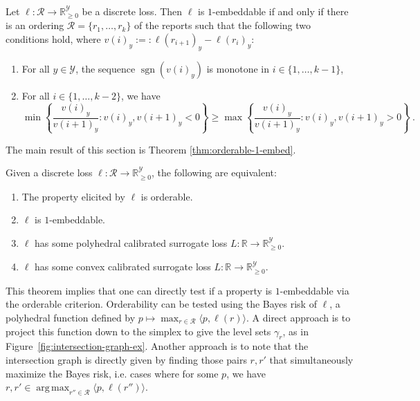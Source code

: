 \documentclass[anon]{colt2020} %
\newcommand{\reals}{\mathbb{R}}
\newcommand{\nonnegreals}{\reals_{\geq 0}}%
\newcommand{\R}{\mathcal{R}}
\newcommand{\Y}{\mathcal{Y}}
\newcommand{\inprod}[2]{\langle #1, #2 \rangle}%
\DeclareMathOperator*{\argmax}{arg\,max}
\DeclareMathOperator*{\sgn}{sgn}
\begin{document}
\begin{theorem}
  Let $\ell: \R \to \nonnegreals^{\Y}$ be a discrete loss.
  Then $\ell$ is $1$-embeddable if and only if there is an ordering $\R = \{r_1,\ldots,r_k\}$ of the reports such that the following two conditions hold, where $v(i)_y := : \ell(r_{i+1})_y - \ell(r_i)_y$:
  \begin{enumerate}
  \item For all $y\in\Y$, the sequence $\sgn(v(i)_y)$ is monotone in
    $i\in\{1,\ldots,k-1\}$,
  \item For all $i\in\{1,\ldots,k-2\}$, we have
    \begin{equation}
      \label{eq:1}
      \min \left\{\frac{v(i)_y}{v({i+1})_y} : v(i)_y, v({i+1})_y < 0\right\}
      \geq
      \max \left\{\frac{v(i)_y}{v({i+1})_y} : v(i)_y, v({i+1})_y > 0\right\}~.
    \end{equation}
  \end{enumerate}
\end{theorem}


The main result of this section is Theorem \ref{thm:orderable-1-embed}.
\begin{theorem} \label{thm:orderable-1-embed}
  Given a discrete loss $\ell: \R \to \nonnegreals^{\Y}$, the following are equivalent:
  \begin{enumerate}
    \item The property elicited by $\ell$ is orderable.
    \item $\ell$ is $1$-embeddable.
    \item $\ell$ has some polyhedral calibrated surrogate loss $L: \reals \to \nonnegreals^{\Y}$.
    \item $\ell$ has some convex calibrated surrogate loss $L: \reals \to \nonnegreals^{\Y}$.
  \end{enumerate}
\end{theorem}
This theorem implies that one can directly test if a property is $1$-embeddable via the orderable criterion.
Orderability can be tested using the Bayes risk of $\ell$, a polyhedral function defined by $p \mapsto \max_{r \in \R} \inprod{p}{\ell(r)}$.
A direct approach is to project this function down to the simplex to give the level sets $\gamma_r$, as in Figure~\ref{fig:intersection-graph-ex}.
Another approach is to note that the intersection graph is directly given by finding those pairs $r,r'$ that simultaneously maximize the Bayes risk, i.e. cases where for some $p$, we have $r,r' \in \argmax_{r'' \in \R} \inprod{p}{\ell(r'')}$.
\end{document}
